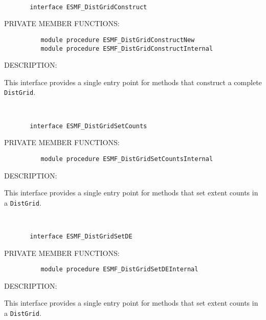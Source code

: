  
\mbox{}\hrulefill\ 
 

\begin{verbatim}       interface ESMF_DistGridConstruct
 \end{verbatim}{\sf PRIVATE MEMBER FUNCTIONS:}
\begin{verbatim}          module procedure ESMF_DistGridConstructNew
          module procedure ESMF_DistGridConstructInternal
 \end{verbatim}
{\sf DESCRIPTION:\\ }


       This interface provides a single entry point for methods that construct
       a complete {\tt DistGrid}.
   
 
\mbox{}\hrulefill\ 
 

\begin{verbatim}       interface ESMF_DistGridSetCounts
 \end{verbatim}{\sf PRIVATE MEMBER FUNCTIONS:}
\begin{verbatim}          module procedure ESMF_DistGridSetCountsInternal
 \end{verbatim}
{\sf DESCRIPTION:\\ }


       This interface provides a single entry point for methods that set
       extent counts in a {\tt DistGrid}.
   
 
\mbox{}\hrulefill\ 
 

\begin{verbatim}       interface ESMF_DistGridSetDE
 \end{verbatim}{\sf PRIVATE MEMBER FUNCTIONS:}
\begin{verbatim}          module procedure ESMF_DistGridSetDEInternal
 \end{verbatim}
{\sf DESCRIPTION:\\ }


       This interface provides a single entry point for methods that set
       extent counts in a {\tt DistGrid}.
   
 
\mbox{}\hrulefill\ 
 

